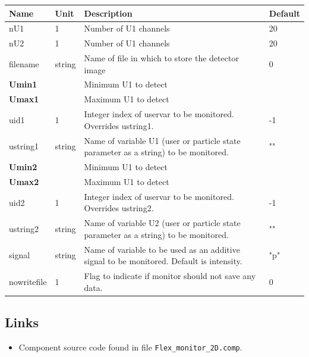 \begin{longtable}{p{}p{}p{}p{}}
\toprule
\textbf{Name} & \textbf{Unit} & \textbf{Description} & \textbf{Default} \\
\midrule
\endhead
nU1 & 1 & Number of U1 channels & 20 \\
nU2 & 1 & Number of U1 channels & 20 \\
filename & string & Name of file in which to store the detector image & 0 \\
\textbf{Umin1} &  & Minimum U1 to detect &  \\
\textbf{Umax1} &  & Maximum U1 to detect &  \\
uid1 & 1 & Integer index of uservar to be monitored. Overrides ustring1. & -1 \\
ustring1 & string & Name of variable U1 (user or particle state parameter as a string) to be monitored. & "" \\
\textbf{Umin2} &  & Minimum U1 to detect &  \\
\textbf{Umax2} &  & Maximum U1 to detect &  \\
uid2 & 1 & Integer index of uservar to be monitored. Overrides ustring2. & -1 \\
ustring2 & string & Name of variable U2 (user or particle state parameter as a string) to be monitored. & "" \\
signal & string & Name of variable to be used as an additive signal to be monitored. Default is intensity. & "p" \\
nowritefile & 1 & Flag to indicate if monitor should not save any data. & 0 \\
\bottomrule
\end{longtable}

\subsection*{Links}
\begin{itemize}
  \item Component source code found in file \texttt{Flex\_monitor\_2D.comp}.
\end{itemize}
